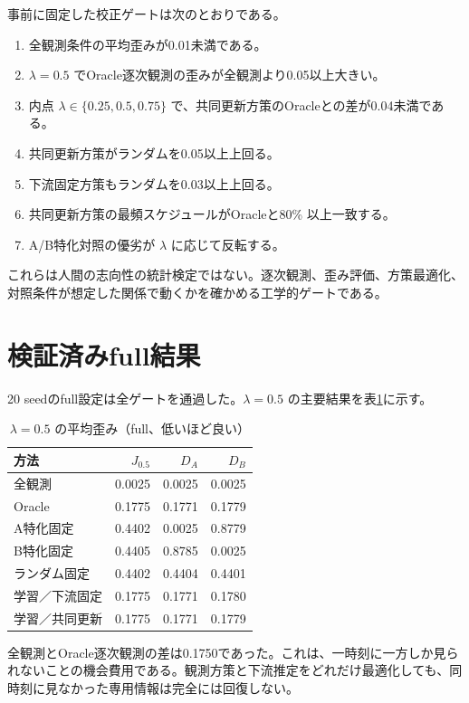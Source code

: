 \documentclass[11pt,a4paper]{ltjsarticle}
\begin{document}
事前に固定した校正ゲートは次のとおりである。
\begin{enumerate}
\item 全観測条件の平均歪みが0.01未満である。
\item $\lambda=0.5$ でOracle逐次観測の歪みが全観測より0.05以上大きい。
\item 内点 $\lambda\in\{0.25,0.5,0.75\}$ で、共同更新方策のOracleとの差が0.04未満である。
\item 共同更新方策がランダムを0.05以上上回る。
\item 下流固定方策もランダムを0.03以上上回る。
\item 共同更新方策の最頻スケジュールがOracleと80\% 以上一致する。
\item A/B特化対照の優劣が $\lambda$ に応じて反転する。
\end{enumerate}

これらは人間の志向性の統計検定ではない。逐次観測、歪み評価、方策最適化、対照条件が想定した関係で動くかを確かめる工学的ゲートである。

\section{検証済みfull結果}

20 seedのfull設定は全ゲートを通過した。$\lambda=0.5$ の主要結果を表\ref{tab:result}に示す。

\begin{table}[ht]
\centering
\caption{$\lambda=0.5$ の平均歪み（full、低いほど良い）}
\label{tab:result}
\begin{tabular}{lrrr}
\toprule
方法 & $J_{0.5}$ & $D_A$ & $D_B$ \\
\midrule
全観測 & 0.0025 & 0.0025 & 0.0025 \\
Oracle & 0.1775 & 0.1771 & 0.1779 \\
A特化固定 & 0.4402 & 0.0025 & 0.8779 \\
B特化固定 & 0.4405 & 0.8785 & 0.0025 \\
ランダム固定 & 0.4402 & 0.4404 & 0.4401 \\
学習／下流固定 & 0.1775 & 0.1771 & 0.1780 \\
学習／共同更新 & 0.1775 & 0.1771 & 0.1779 \\
\bottomrule
\end{tabular}
\end{table}

全観測とOracle逐次観測の差は0.1750であった。これは、一時刻に一方しか見られないことの機会費用である。観測方策と下流推定をどれだけ最適化しても、同時刻に見なかった専用情報は完全には回復しない。
\end{document}
